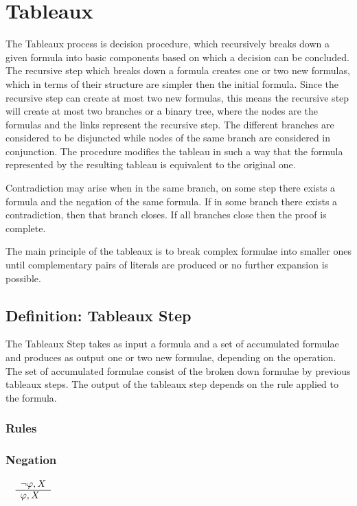 \documentclass{article}
\begin{document}
	\section{Tableaux}
	The Tableaux process is decision procedure, which recursively breaks down a given formula into basic components 
	based on which a decision can be concluded. The recursive step which breaks down a formula creates one or two 
	new formulas, which in terms of their structure are simpler then the initial formula. Since the recursive step can create
	at most two new formulas, this means the recursive step will create at most two branches or a binary tree, where the nodes
	are the formulas and the links represent the recursive step. The different branches are considered to be disjuncted while
   	nodes of the same branch are considered in conjunction. The procedure modifies the tableau in such a way that the 
	formula represented by the resulting tableau is equivalent to the original one.

	Contradiction may arise when in the same branch, on some step there exists a formula and the negation of the same formula.
	If in some branch there exists a contradiction, then that branch closes. If all branches close then the proof is complete.
	
	The main principle of the tableaux is to break complex formulae into smaller ones until complementary pairs of literals are
	produced or no further expansion is possible.

	\subsection{Definition: Tableaux Step}
		The Tableaux Step takes as input a formula and a set of accumulated formulae and produces as 
		output one or two new formulae, depending on the operation. 
		The set of accumulated formulae consist of the broken down formulae by previous tableaux steps.
		The output of the tableaux step depends on the rule applied to the formula.

		\subsubsection{Rules}
		\subsubsection*{Negation}
			$\begin{array}{rl}
				& \neg \varphi, X \\
			      \cline{2-2}
			      & \varphi, X
			\end{array}$
\end{document}
